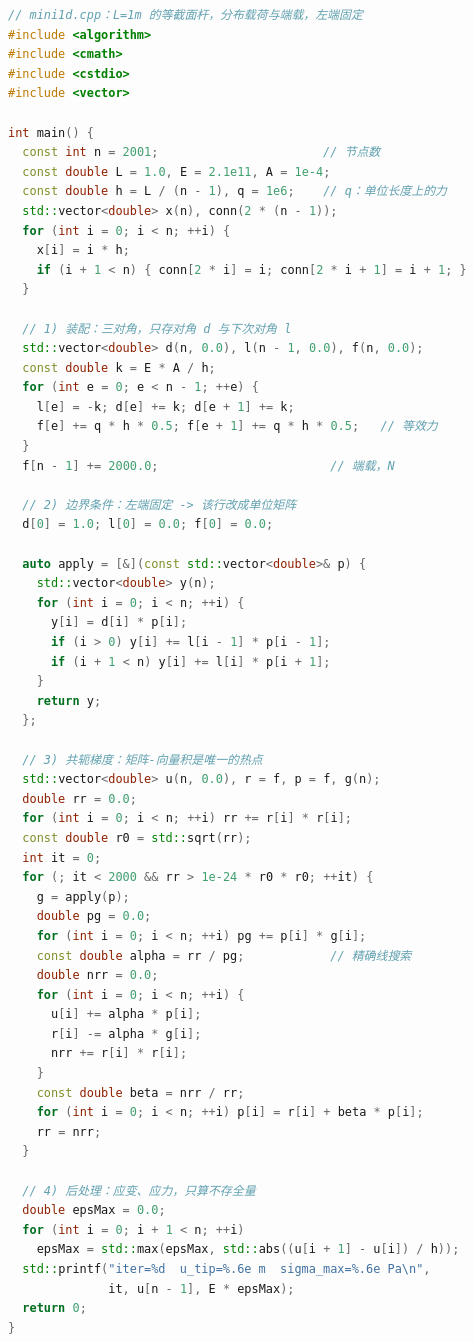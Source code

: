 \documentclass[12pt,a4paper,fontset=fandol]{ctexbook}
\begin{document}
\begin{lstlisting}[language=C++, style=cppstyle,
  caption={贯穿例子：网格、装配、共轭梯度、后处理四步都在一个文件里},
  label={lst:ch01-mini1d}]
// mini1d.cpp：L=1m 的等截面杆，分布载荷与端载，左端固定
#include <algorithm>
#include <cmath>
#include <cstdio>
#include <vector>

int main() {
  const int n = 2001;                       // 节点数
  const double L = 1.0, E = 2.1e11, A = 1e-4;
  const double h = L / (n - 1), q = 1e6;    // q：单位长度上的力
  std::vector<double> x(n), conn(2 * (n - 1));
  for (int i = 0; i < n; ++i) {
    x[i] = i * h;
    if (i + 1 < n) { conn[2 * i] = i; conn[2 * i + 1] = i + 1; }
  }

  // 1) 装配：三对角，只存对角 d 与下次对角 l
  std::vector<double> d(n, 0.0), l(n - 1, 0.0), f(n, 0.0);
  const double k = E * A / h;
  for (int e = 0; e < n - 1; ++e) {
    l[e] = -k; d[e] += k; d[e + 1] += k;
    f[e] += q * h * 0.5; f[e + 1] += q * h * 0.5;   // 等效力
  }
  f[n - 1] += 2000.0;                        // 端载，N

  // 2) 边界条件：左端固定 -> 该行改成单位矩阵
  d[0] = 1.0; l[0] = 0.0; f[0] = 0.0;

  auto apply = [&](const std::vector<double>& p) {
    std::vector<double> y(n);
    for (int i = 0; i < n; ++i) {
      y[i] = d[i] * p[i];
      if (i > 0) y[i] += l[i - 1] * p[i - 1];
      if (i + 1 < n) y[i] += l[i] * p[i + 1];
    }
    return y;
  };

  // 3) 共轭梯度：矩阵-向量积是唯一的热点
  std::vector<double> u(n, 0.0), r = f, p = f, g(n);
  double rr = 0.0;
  for (int i = 0; i < n; ++i) rr += r[i] * r[i];
  const double r0 = std::sqrt(rr);
  int it = 0;
  for (; it < 2000 && rr > 1e-24 * r0 * r0; ++it) {
    g = apply(p);
    double pg = 0.0;
    for (int i = 0; i < n; ++i) pg += p[i] * g[i];
    const double alpha = rr / pg;            // 精确线搜索
    double nrr = 0.0;
    for (int i = 0; i < n; ++i) {
      u[i] += alpha * p[i];
      r[i] -= alpha * g[i];
      nrr += r[i] * r[i];
    }
    const double beta = nrr / rr;
    for (int i = 0; i < n; ++i) p[i] = r[i] + beta * p[i];
    rr = nrr;
  }

  // 4) 后处理：应变、应力，只算不存全量
  double epsMax = 0.0;
  for (int i = 0; i + 1 < n; ++i)
    epsMax = std::max(epsMax, std::abs((u[i + 1] - u[i]) / h));
  std::printf("iter=%d  u_tip=%.6e m  sigma_max=%.6e Pa\n",
              it, u[n - 1], E * epsMax);
  return 0;
}
\end{lstlisting}
\end{document}
